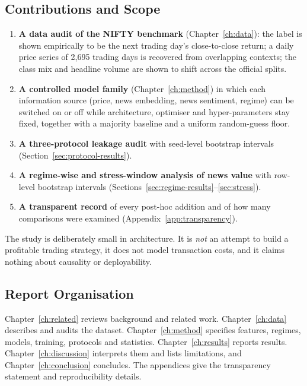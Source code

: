 \subsection{Contributions and Scope}
\begin{enumerate}
\item \textbf{A data audit of the NIFTY benchmark} (Chapter~\ref{ch:data}): the label is shown empirically to be the next trading day's close-to-close return; a daily price series of 2{,}695 trading days is recovered from overlapping contexts; the class mix and headline volume are shown to shift across the official splits.
\item \textbf{A controlled model family} (Chapter~\ref{ch:method}) in which each information source (price, news embedding, news sentiment, regime) can be switched on or off while architecture, optimiser and hyper-parameters stay fixed, together with a majority baseline and a uniform random-guess floor.
\item \textbf{A three-protocol leakage audit} with seed-level bootstrap intervals (Section~\ref{sec:protocol-results}).
\item \textbf{A regime-wise and stress-window analysis of news value} with row-level bootstrap intervals (Sections~\ref{sec:regime-results}--\ref{sec:stress}).
\item \textbf{A transparent record} of every post-hoc addition and of how many comparisons were examined (Appendix~\ref{app:transparency}).
\end{enumerate}
The study is deliberately small in architecture. It is \emph{not} an attempt to build a profitable trading strategy, it does not model transaction costs, and it claims nothing about causality or deployability.

\subsection{Report Organisation}
Chapter~\ref{ch:related} reviews background and related work. Chapter~\ref{ch:data} describes and audits the dataset. Chapter~\ref{ch:method} specifies features, regimes, models, training, protocols and statistics. Chapter~\ref{ch:results} reports results. Chapter~\ref{ch:discussion} interprets them and lists limitations, and Chapter~\ref{ch:conclusion} concludes. The appendices give the transparency statement and reproducibility details.
